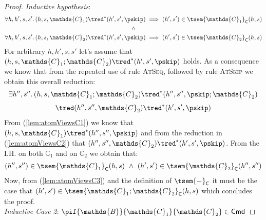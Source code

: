 \begin{lem}
{\begin{proof}
	\textit{Inductive hypothesis}:
	\begin{gather*}
		\forall h, h', s, s' \ldotp
		(h, s, \mathds{C}_1) \tred^* (h', s', \pskip)
		\implies
		(h', s') \in \tsem{\mathds{C}_1}_\mathsf{C}(h, s) \\
		\land \\
		\forall h, h', s, s' \ldotp
		(h, s, \mathds{C}_2) \tred^* (h', s', \pskip)
		\implies
		(h', s') \in \tsem{\mathds{C}_2}_\mathsf{C}(h, s)
	\end{gather*}
	For arbitrary $h, h', s, s'$ let's assume that $(h, s, \mathds{C}_1 ; \mathds{C}_2) \tred^* (h', s', \pskip)$ holds. As a consequence we know that from the repeated use of rule \textsc{AtSeq}, followed by rule \textsc{AtSkip} we obtain this overall reduction:
	\begin{gather}
		\label{lem:atomViewsC1}
		\exists h'', s'' \ldotp (h, s, \mathds{C}_1 ; \mathds{C}_2)
			\tred^*
		(h'', s'', \pskip ; \mathds{C}_2) \\[0.4em]
		\label{lem:atomViewsC2}
			\tred
		(h'', s'', \mathds{C}_2)
			\tred^*
		(h', s', \pskip)
	\end{gather}
	From (\ref{lem:atomViewsC1}) we know that $(h, s, \mathds{C}_1) \tred^* (h'', s'', \pskip)$ and from the reduction in (\ref{lem:atomViewsC2}) that $(h'', s'', \mathds{C}_2) \tred^* (h', s', \pskip)$. From the I.H. on both $\mathds{C}_1$ and on $\mathds{C}_2$ we obtain that:
	\begin{gather}
		\label{lem:atomViewsC3}
		(h'', s'') \in \tsem{\mathds{C}_1}_\mathsf{C}(h, s)\
		\land\
		(h', s') \in \tsem{\mathds{C}_2}_\mathsf{C}(h'', s'')
	\end{gather}
	Now, from (\ref{lem:atomViewsC3}) and the definition of $\tsem{-}_\mathsf{C}$ it must be the case that $(h', s') \in \tsem{\mathds{C}_1 ; \mathds{C}_2}_\mathsf{C}(h, s)$ which concludes the proof. \\
	\indline
	\textit{Inductive Case 2}: $\pif{\mathds{B}}{\mathds{C}_1}{\mathds{C}_2} \in \mathsf{Cmd}$
	

\end{proof}}
\end{lem}
